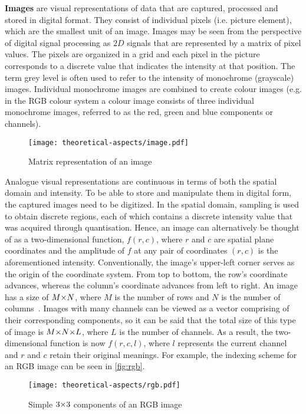


\textbf{Images} are visual representations of data that are captured, processed and stored in digital format. They consist of individual pixels (i.e. picture element), which are the smallest unit of an image. Images may be seen from the perspective of digital signal processing as $2D$ signals that are represented by a matrix of pixel values. The pixels are organized in a grid and each pixel in the picture corresponds to a discrete value that indicates the intensity at that position. The term grey level is often used to refer to the intensity of monochrome (grayscale) images. Individual monochrome images are combined to create colour images (e.g. in the RGB colour system a colour image consists of three individual monochrome images, referred to as the red, green and blue components or channels).~\supercite{vertan}

\begin{figure}[ht]
    \centering
    \texttt{[image: theoretical-aspects/image.pdf]}
    \caption{Matrix representation of an image}
    \label{fig:image}
\end{figure}

Analogue visual representations are continuous in terms of both the spatial domain and intensity. To be able to store and manipulate them in digital form, the captured images need to be digitized. In the spatial domain, sampling is used to obtain discrete regions, each of which contains a discrete intensity value that was acquired through quantisation. Hence, an image can alternatively be thought of as a two-dimensional function, $f(r, c)$, where $r$ and $c$ are spatial plane coordinates and the amplitude of $f$ at any pair of coordinates $(r, c)$ is the aforementioned intensity. Conventionally, the image's upper-left corner serves as the origin of the coordinate system. From top to bottom, the row's coordinate advances, whereas the column's coordinate advances from left to right. An image has a size of $M {\times} N$, where $M$ is the number of rows and $N$ is the number of columns~\supercite{matlab}. Images with many channels can be viewed as a vector comprising of their corresponding components, so it can be said that the total size of this type of image is $M {\times} N {\times} L$, where $L$ is the number of channels. As a result, the two-dimensional function is now $f(r, c, l)$, where $l$ represents the current channel and $r$ and $c$ retain their original meanings. For example, the indexing scheme for an RGB image can be seen in \autoref{fig:rgb}.
\begin{figure}[ht]
    \centering
    \texttt{[image: theoretical-aspects/rgb.pdf]}
    \caption{Simple $3 {\times} 3$ components of an RGB image}
    \label{fig:rgb}
\end{figure}

